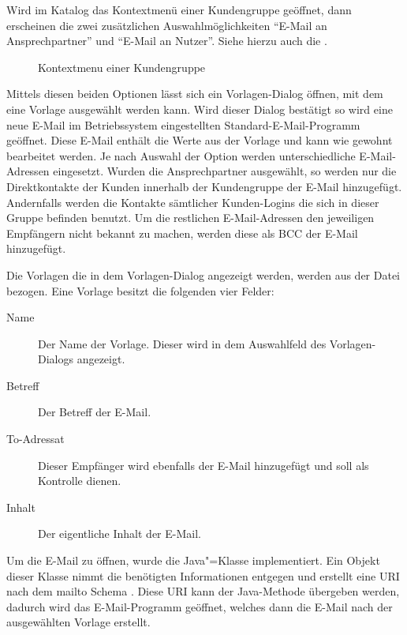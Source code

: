 Wird im Katalog das Kontextmenü einer Kundengruppe geöffnet, dann erscheinen die zwei zusätzlichen Auswahlmöglichkeiten "`E-Mail an Ansprechpartner"' und "`E-Mail an Nutzer"'.
Siehe hierzu auch die .
\begin{figure}[htb]
	\centering
	\caption{Kontextmenu einer Kundengruppe}
	\label{fig:gui-kundengruppe-context}
\end{figure}
Mittels diesen beiden Optionen lässt sich ein Vorlagen-Dialog öffnen, mit dem eine Vorlage ausgewählt werden kann.
Wird dieser Dialog bestätigt so wird eine neue E-Mail im Betriebssystem eingestellten Standard-E-Mail-Programm geöffnet.
Diese E-Mail enthält die Werte aus der Vorlage und kann wie gewohnt bearbeitet werden.
Je nach Auswahl der Option werden unterschiedliche E-Mail-Adressen eingesetzt.
Wurden die Ansprechpartner ausgewählt, so werden nur die Direktkontakte der Kunden innerhalb der Kundengruppe der E-Mail hinzugefügt.
Andernfalls werden die Kontakte sämtlicher Kunden-Logins die sich in dieser Gruppe befinden benutzt.
Um die restlichen E-Mail-Adressen den jeweiligen Empfängern nicht bekannt zu machen, werden diese als BCC der E-Mail hinzugefügt.

Die Vorlagen die in dem Vorlagen-Dialog angezeigt werden, werden aus der Datei  bezogen. Eine Vorlage besitzt die folgenden vier Felder:
\begin{description}
\item[Name] Der Name der Vorlage. Dieser wird in dem Auswahlfeld des Vorlagen-Dialogs angezeigt.
\item[Betreff] Der Betreff der E-Mail.
\item[To-Adressat] Dieser Empfänger wird ebenfalls der E-Mail hinzugefügt und soll als Kontrolle dienen.
\item[Inhalt] Der eigentliche Inhalt der E-Mail.
\end{description}

Um die E-Mail zu öffnen, wurde die Java"=Klasse  implementiert.
Ein Objekt dieser Klasse nimmt die benötigten Informationen entgegen und erstellt eine URI nach dem mailto Schema \autocite{RFC2368}.
Diese URI kann der Java-Methode  \autocite{java-mailto} übergeben werden, dadurch wird das E-Mail-Programm geöffnet, welches dann die E-Mail nach der ausgewählten Vorlage erstellt.

